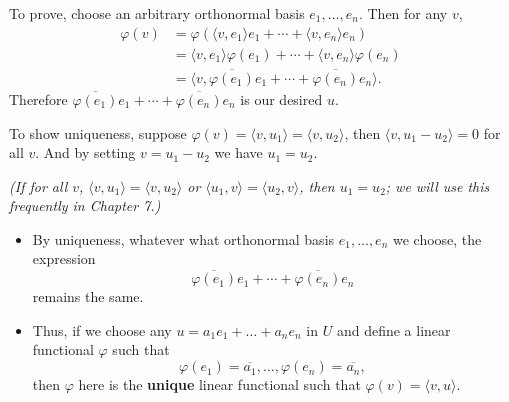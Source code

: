 \documentclass{article}
\newcommand{\conj}[1]{\overline{#1}}
\newcommand{\inp}[2]{\langle #1, #2 \rangle}
\renewcommand{\phi}{\varphi}
\begin{document}
\begin{itemize}
    To prove, choose an arbitrary orthonormal basis $e_1,\dots,e_n$. Then for any $v$,
    \begin{align*}
        \phi(v) & = \phi(\inp{v}{e_1}e_1+\cdots+\inp{v}{e_n}e_n) \\ & = \inp{v}{e_1}\phi(e_1)+\cdots+\inp{v}{e_n}\phi(e_n) \\ & = \inp{v}{\conj{\phi(e_1)}e_1+\cdots+\conj{\phi(e_n)}e_n}.
    \end{align*}
    Therefore $\conj{\phi(e_1)}e_1+\cdots+\conj{\phi(e_n)}e_n$ is our desired $u$.
    
    To show uniqueness, suppose $\phi(v) = \inp{v}{u_1} = \inp{v}{u_2}$, then $\inp{v}{u_1 - u_2} = 0$ for all $v$. And by setting $v = u_1 - u_2$ we have $u_1 = u_2$.
    
    \emph{(If for all $v$, $\inp{v}{u_1} = \inp{v}{u_2}$ or $\inp{u_1}{v} = \inp{u_2}{v}$, then $u_1 = u_2$; we will use this frequently in Chapter 7.)}
    \begin{itemize}
        \item By uniqueness, whatever what orthonormal basis $e_1,\dots,e_n$ we choose, the expression $$\conj{\phi(e_1)}e_1+\cdots+\conj{\phi(e_n)}e_n$$ remains the same.
        \item Thus, if we choose any $u = a_1 e_1 + \dots + a_n e_n$ in $U$ and define a linear functional $\phi$ such that $$\phi(e_1)=\conj{a_1},\dots,\phi(e_n)=\conj{a_n},$$ then $\phi$ here is the \textbf{unique} linear functional such that $\phi(v) = \inp{v}{u}$.
    \end{itemize}
\end{itemize}
\end{document}
